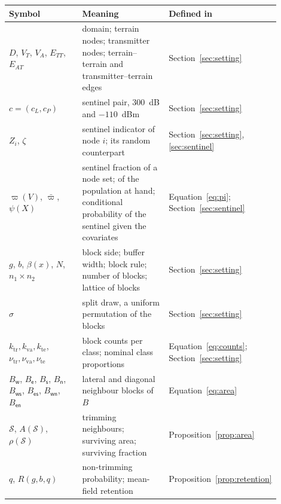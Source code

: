 \begin{tabular}{>{\raggedright\arraybackslash}p{0.30\linewidth}>{\raggedright\arraybackslash}p{0.38\linewidth}>{\raggedright\arraybackslash}p{0.22\linewidth}}
\toprule
\textbf{Symbol} & \textbf{Meaning} & \textbf{Defined in} \\
\midrule
$D$, $V_T$, $V_A$, $E_{TT}$, $E_{AT}$ & domain; terrain nodes; transmitter nodes; terrain--terrain and transmitter--terrain edges & Section~\ref{sec:setting} \\
$c = (c_L, c_P)$ & sentinel pair, $300$~dB and $-110$~dBm & Section~\ref{sec:setting} \\
$Z_i$, $\zeta$ & sentinel indicator of node $i$; its random counterpart & Section~\ref{sec:setting}, \ref{sec:sentinel} \\
$\varpi(V)$, $\bar\varpi$, $\psi(X)$ & sentinel fraction of a node set; of the population at hand; conditional probability of the sentinel given the covariates & Equation~\eqref{eq:pi}; Section~\ref{sec:sentinel} \\
$g$, $b$, $\beta(x)$, $N$, $n_1 \times n_2$ & block side; buffer width; block rule; number of blocks; lattice of blocks & Section~\ref{sec:setting} \\
$\sigma$ & split draw, a uniform permutation of the blocks & Section~\ref{sec:setting} \\
$k_{\mathrm{tr}}, k_{\mathrm{va}}, k_{\mathrm{te}}$, $\nu_{\mathrm{tr}}, \nu_{\mathrm{va}}, \nu_{\mathrm{te}}$ & block counts per class; nominal class proportions & Equation~\eqref{eq:counts}; Section~\ref{sec:setting} \\
$B_{\mathsf{w}}$, $B_{\mathsf{e}}$, $B_{\mathsf{s}}$, $B_{\mathsf{n}}$, $B_{\mathsf{ws}}$, $B_{\mathsf{es}}$, $B_{\mathsf{wn}}$, $B_{\mathsf{en}}$ & lateral and diagonal neighbour blocks of $B$ & Equation~\eqref{eq:area} \\
$\mathcal{S}$, $A(\mathcal{S})$, $\rho(\mathcal{S})$ & trimming neighbours; surviving area; surviving fraction & Proposition~\ref{prop:area} \\
$q$, $R(g,b,q)$ & non-trimming probability; mean-field retention & Proposition~\ref{prop:retention} \\

\end{tabular}
